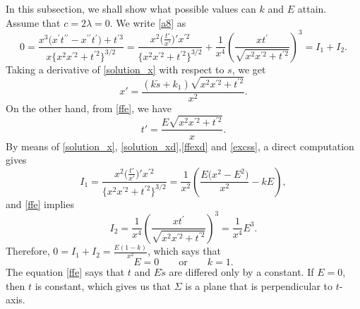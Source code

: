 \documentclass[pdftex]{sigma}
\numberwithin{equation}{section}
\begin{document}
In this subsection, we shall show what possible values can $k$ and $E$ attain.
Assume that $c=2\lambda=0$. We write \eqref{a8} as
\begin{equation*}%
0=\frac{x^{3}\bigl(x^{\prime }t^{\prime \prime }-x^{\prime \prime
}t^{\prime }\bigr)+t^{\prime 3}}{x\big\{x^2x^{\prime 2}+t^{\prime 2}\big\}^{3/2}}=\frac{x^{2}\bigl(\frac{t'}{x'}\bigr)'x^{\prime 2}}{\big\{x^2x^{\prime 2}+t^{\prime 2}\big\}^{3/2}}+\frac{1}{x^4}\left(\frac{xt^{\prime}}{\sqrt{x^{2}x^{\prime 2}+t^{\prime 2}}}\right)^3=I_1+I_2.
\end{equation*}
Taking a derivative of \eqref{solution_x} with respect to $s$, we get
\begin{equation}\label{solution_xd}
x'=\frac{(k\tilde{s}+k_{1})\sqrt{x^2x^{\prime 2}+t^{\prime 2}}}{x^2}.
\end{equation}
On the other hand, from \eqref{ffe}, we have
\begin{equation}\label{ffexd}
t'=\frac{E\sqrt{x^2x^{\prime 2}+t^{\prime 2}}}{x}.
\end{equation}
By means of \eqref{solution_x}, \eqref{solution_xd},\eqref{ffexd} and \eqref{excss}, a direct computation gives
\[
I_1=\frac{x^{2}\bigl(\frac{t'}{x'}\bigr)'x^{\prime 2}}{\big\{x^2x^{\prime 2}+t^{\prime 2}\big\}^{3/2}}=\frac{1}{x^2}\left(\frac{E\bigl(x^{2}-E^{2}\bigr)}{x^2}-kE\right),
\]
and \eqref{ffe} implies
\begin{equation*}
I_2=\frac{1}{x^4}\left(\frac{xt^{\prime}}{\sqrt{x^{2}x^{\prime 2}+t^{\prime 2}}}\right)^3=\frac{1}{x^{4}}E^3.
\end{equation*}
Therefore,
$0=I_1+I_2=\frac{E(1-k)}{x^2}$,
which says that
\begin{equation}\label{ekvl}
E=0\qquad \textrm{or}\qquad k=1.
\end{equation}
The equation \eqref{ffe} says that $t $ and $E\tilde s$ are differed only by a constant. If $E=0$, then $t$ is constant, which gives us that $\Sigma$ is a plane that is perpendicular to $t$-axis.
\end{document}
